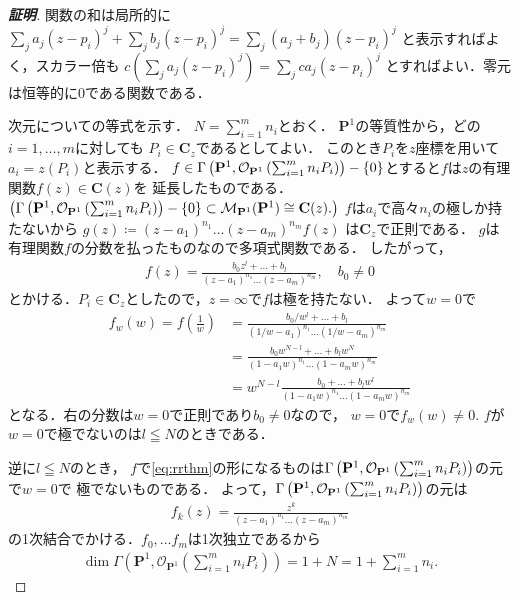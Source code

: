 \documentclass[11pt, a4paper, dvipdfmx, draft]{jsarticle}
\theoremstyle{definition}
\newcommand{\cc}{\mathbf{C}}
\newcommand{\pp}{\mathbf{P}}
\newcommand{\mcal}{\mathcal}
\newcommand{\OO}{\mcal{O}}
\theoremstyle{mystyle}
\numberwithin{equation}{section} %
\newcommand{\MM}{\mcal{M}}
\begin{document}
\begin{proof}[\bf{証明}]
    関数の和は局所的に
    $\sum_j a_j(z-p_i)^j + \sum_j b_j(z-p_i)^j 
    = \sum_j (a_j + b_j)(z-p_i)^j$
    と表示すればよく，スカラー倍も
    $c\left(\sum_j a_j(z-p_i)^j\right) = \sum_j ca_j(z-p_i)^j$
    とすればよい．零元は恒等的に$0$である関数である．

    次元についての等式を示す．
    $N = \sum_{i=1}^{m} n_{i}$とおく．
    $\pp^1$の等質性から，どの$i=1,\dots,m$に対しても
    $P_i \in\cc_z$であるとしてよい．
    このとき$P_i$を$z$座標を用いて$a_i=z(P_i)$と表示する．
    $f\in \rrsp-\{0\}$とすると$f$は$z$の有理関数$f(z)\in\cc(z)$を
    延長したものである．$\left(\rrsp -\{0\}\subset \MM_{\pp^1}(\pp^1)\cong \cc(z).\right)$ 
    $f$は$a_i$で高々$n_i$の極しか持たないから
    $g(z)\coloneqq(z-a_1)^{n_1}\dots(z-a_m)^{n_m}f(z)$
    は$\cc_z$で正則である．
    $g$は有理関数$f$の分数を払ったものなので多項式関数である．
    したがって，
    \begin{align}
        f(z) = \frac{b_0z^l+\dots+b_l}{(z-a_1)^{n_1}\dots(z-a_m)^{n_m}},\quad b_0\ne0 \label{eq:rrthm}
    \end{align}
    とかける．$P_i\in\cc_z$としたので，$z=\infty$で$f$は極を持たない．
    よって$w=0$で
    \begin{align*}
        f_{w}(w) = f\left(\frac{1}{w}\right) 
        &= \frac{b_0/w^l+\dots+b_l}{(1/w-a_1)^{n_1}\dots(1/w-a_m)^{n_m}}\\
        &= \frac{b_0w^{N-l}+\dots+b_lw^{N}}{(1-a_1w)^{n_1}\dots(1-a_mw)^{n_m}}\\
        &= w^{N-l}\frac{b_0+\dots+b_lw^l}{(1-a_1w)^{n_1}\dots(1-a_mw)^{n_m}}
    \end{align*}
    となる．右の分数は$w=0$で正則であり$b_0\ne 0$なので，
    $w=0$で$f_w(w)\ne0$. 
    $f$が$w=0$で極でないのは$l\leqq N$のときである．

    逆に$l\leqq N$のとき，
    $f$で\eqref{eq:rrthm}の形になるものは$\rrsp$の元で$w=0$で
    極でないものである．
    よって，$\rrsp$の元は
    \begin{align*}
    f_k(z)=\frac{z^k}{(z-a_1)^{n_1}\dots(z-a_m)^{n_m}}
    \end{align*}
    の1次結合でかける．$f_0,\dots f_m$は1次独立であるから
    \begin{align*}
        \dim\Gamma\left(
            \pp^{1}, \OO_{\pp^{1}}\left(
                \sum_{i=1}^{m}n_{i}P_{i}
                \right)
            \right)
        = 1 + N 
        = 1+\sum_{i=1}^{m}n_{i}.
    \end{align*}
\end{proof}
\end{document}
